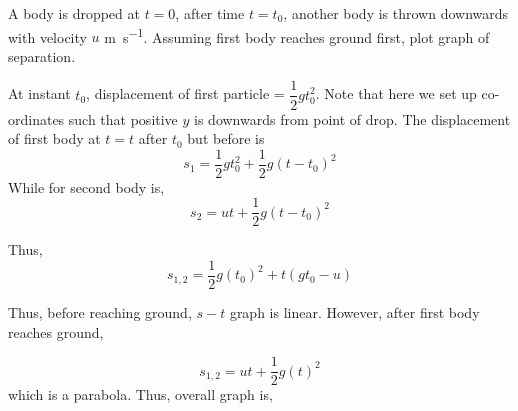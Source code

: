 \begin{example}
    A body is dropped at \(t = 0\), after time \(t = t_0\), another body is thrown downwards with
    velocity \(u\) \unit{\meter\per\second}. Assuming first body reaches ground first, plot graph
    of separation.

    \begin{soln}
        At instant \(t_0\), displacement of first particle = \(\dfrac{1}{2}gt_{0}^2\). Note that here
        we set up co-ordinates such that positive \(y\) is downwards from point of drop. The displacement 
        of first body at \(t = t\) after \(t_0\) but before  is
        \begin{equation}
            s_1 = \frac{1}{2}gt_{0}^2 + \frac{1}{2}g(t-t_0)^2
        \end{equation}
        While for second body is,
        \begin{equation}
            s_2 = ut + \frac{1}{2}g(t-t_0)^2
        \end{equation}

        Thus, 
        \begin{equation}
            s_{1,2} = \frac{1}{2}g(t_0)^2 + t(gt_0 - u)
        \end{equation}

        Thus, before reaching ground, \(s-t\) graph is linear. However, after first body reaches ground,

        \begin{equation}
            s_{1,2} = ut + \frac{1}{2}g(t)^2
        \end{equation}
        which is a parabola. Thus, overall graph is,
        \begin{figure}[H]
            \centering
        \end{figure}
    \end{soln}
\end{example}

